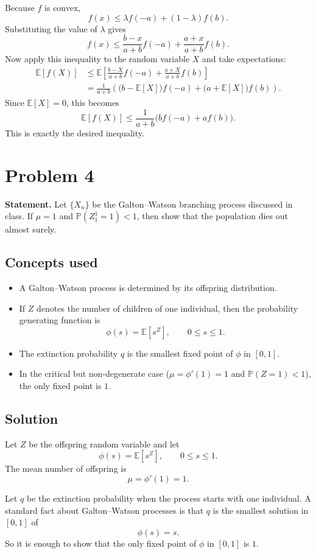 \documentclass[11pt]{article}
\newcommand{\EE}{\mathbb{E}}
\newcommand{\PP}{\mathbb{P}}
\begin{document}
Because $f$ is convex,
\[
f(x) \le \lambda f(-a) + (1-\lambda)f(b).
\]
Substituting the value of $\lambda$ gives
\[
f(x) \le \frac{b-x}{a+b}f(-a) + \frac{a+x}{a+b}f(b).
\]
Now apply this inequality to the random variable $X$ and take expectations:
\begin{align*}
\EE[f(X)]
&\le \EE\left[\frac{b-X}{a+b}f(-a) + \frac{a+X}{a+b}f(b)\right] \\
&= \frac{1}{a+b}\left(\bigl(b-\EE[X]\bigr)f(-a) + \bigl(a+\EE[X]\bigr)f(b)\right).
\end{align*}
Since $\EE[X]=0$, this becomes
\[
\EE[f(X)] \le \frac{1}{a+b}\bigl(bf(-a)+af(b)\bigr).
\]
This is exactly the desired inequality.

\section*{Problem 4}

\textbf{Statement.} Let $\{X_n\}$ be the Galton--Watson branching process discussed in class.
If $\mu=1$ and $\PP(Z_1^1=1)<1$, then show that the population dies out almost surely.

\subsection*{Concepts used}

\begin{itemize}
\item A Galton--Watson process is determined by its offspring distribution.
\item If $Z$ denotes the number of children of one individual, then the probability generating
      function is
      \[
      \phi(s)=\EE[s^Z], \qquad 0\le s\le 1.
      \]
\item The extinction probability $q$ is the smallest fixed point of $\phi$ in $[0,1]$.
\item In the critical but non-degenerate case ($\mu=\phi'(1)=1$ and $\PP(Z=1)<1$), the only
      fixed point is $1$.
\end{itemize}

\subsection*{Solution}

Let $Z$ be the offspring random variable and let
\[
\phi(s)=\EE[s^Z], \qquad 0\le s\le 1.
\]
The mean number of offspring is
\[
\mu=\phi'(1)=1.
\]

Let $q$ be the extinction probability when the process starts with one individual. A standard
fact about Galton--Watson processes is that $q$ is the smallest solution in $[0,1]$ of
\[
\phi(s)=s.
\]
So it is enough to show that the only fixed point of $\phi$ in $[0,1]$ is $1$.
\end{document}
